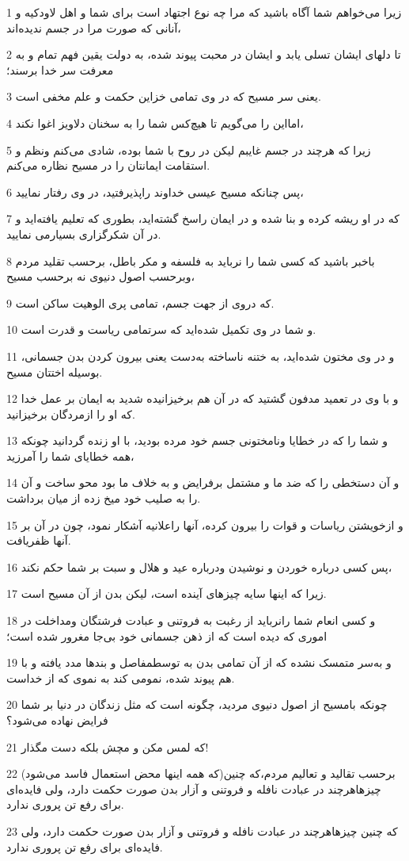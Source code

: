 \par 1 زیرا می‌خواهم شما آگاه باشید که مرا چه نوع اجتهاد است برای شما و اهل لاودکیه و آنانی که صورت مرا در جسم ندیده‌اند،
\par 2 تا دلهای ایشان تسلی یابد و ایشان در محبت پیوند شده، به دولت یقین فهم تمام و به معرفت سر خدا برسند؛
\par 3 یعنی سر مسیح که در وی تمامی خزاین حکمت و علم مخفی است.
\par 4 امااین را می‌گویم تا هیچ‌کس شما را به سخنان دلاویز اغوا نکند،
\par 5 زیرا که هرچند در جسم غایبم لیکن در روح با شما بوده، شادی می‌کنم ونظم و استقامت ایمانتان را در مسیح نظاره می‌کنم.
\par 6 پس چنانکه مسیح عیسی خداوند راپذیرفتید، در وی رفتار نمایید،
\par 7 که در او ریشه کرده و بنا شده و در ایمان راسخ گشته‌اید، بطوری که تعلیم یافته‌اید و در آن شکرگزاری بسیارمی نمایید.
\par 8 باخبر باشید که کسی شما را نرباید به فلسفه و مکر باطل، برحسب تقلید مردم وبرحسب اصول دنیوی نه برحسب مسیح،
\par 9 که دروی از جهت جسم، تمامی پری الوهیت ساکن است.
\par 10 و شما در وی تکمیل شده‌اید که سرتمامی ریاست و قدرت است.
\par 11 و در وی مختون شده‌اید، به ختنه ناساخته به‌دست یعنی بیرون کردن بدن جسمانی، بوسیله اختتان مسیح.
\par 12 و با وی در تعمید مدفون گشتید که در آن هم برخیزانیده شدید به ایمان بر عمل خدا که او را ازمردگان برخیزانید.
\par 13 و شما را که در خطایا ونامختونی جسم خود مرده بودید، با او زنده گردانید چونکه همه خطایای شما را آمرزید،
\par 14 و آن دستخطی را که ضد ما و مشتمل برفرایض و به خلاف ما بود محو ساخت و آن را به صلیب خود میخ زده از میان برداشت.
\par 15 و ازخویشتن ریاسات و قوات را بیرون کرده، آنها راعلانیه آشکار نمود، چون در آن بر آنها ظفریافت.
\par 16 پس کسی درباره خوردن و نوشیدن ودرباره عید و هلال و سبت بر شما حکم نکند،
\par 17 زیرا که اینها سایه چیزهای آینده است، لیکن بدن از آن مسیح است.
\par 18 و کسی انعام شما رانرباید از رغبت به فروتنی و عبادت فرشتگان ومداخلت در اموری که دیده است که از ذهن جسمانی خود بی‌جا مغرور شده است؛
\par 19 و به‌سر متمسک نشده که از آن تمامی بدن به توسطمفاصل و بندها مدد یافته و با هم پیوند شده، نمومی کند به نموی که از خداست.
\par 20 چونکه بامسیح از اصول دنیوی مردید، چگونه است که مثل زندگان در دنیا بر شما فرایض نهاده می‌شود؟
\par 21 که لمس مکن و مچش بلکه دست مگذار!
\par 22 (که همه اینها محض استعمال فاسد می‌شود)برحسب تقالید و تعالیم مردم،که چنین چیزهاهرچند در عبادت نافله و فروتنی و آزار بدن صورت حکمت دارد، ولی فایده‌ای برای رفع تن پروری ندارد.
\par 23 که چنین چیزهاهرچند در عبادت نافله و فروتنی و آزار بدن صورت حکمت دارد، ولی فایده‌ای برای رفع تن پروری ندارد.

